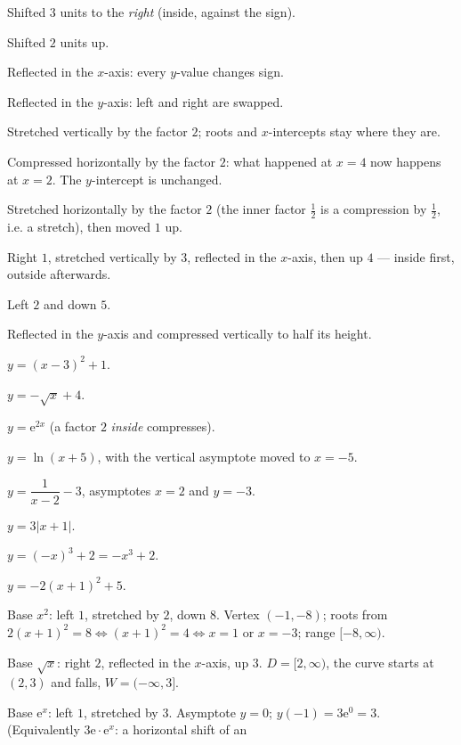 \begin{solutions}
  \item Shifted $3$ units to the \emph{right} (inside, against the sign).
  \item Shifted $2$ units up.
  \item Reflected in the $x$-axis: every $y$-value changes sign.
  \item Reflected in the $y$-axis: left and right are swapped.
  \item Stretched vertically by the factor $2$; roots and $x$-intercepts
        stay where they are.
  \item Compressed horizontally by the factor $2$: what happened at $x=4$
        now happens at $x=2$. The $y$-intercept is unchanged.
  \item Stretched horizontally by the factor $2$ (the inner factor
        $\tfrac12$ is a compression by $\tfrac12$, i.e. a stretch), then
        moved $1$ up.
  \item Right $1$, stretched vertically by $3$, reflected in the $x$-axis,
        then up $4$ --- inside first, outside afterwards.
  \item Left $2$ and down $5$.
  \item Reflected in the $y$-axis and compressed vertically to half its
        height.
  \item $y=(x-3)^{2}+1$.
  \item $y=-\sqrt{x}+4$.
  \item $y=\mathrm{e}^{2x}$ (a factor $2$ \emph{inside} compresses).
  \item $y=\ln(x+5)$, with the vertical asymptote moved to $x=-5$.
  \item $y=\dfrac{1}{x-2}-3$, asymptotes $x=2$ and $y=-3$.
  \item $y=3|x+1|$.
  \item $y=(-x)^{3}+2=-x^{3}+2$.
  \item $y=-2(x+1)^{2}+5$.
  \item Base $x^{2}$: left $1$, stretched by $2$, down $8$. Vertex
        $(-1,-8)$; roots from $2(x+1)^{2}=8\iff(x+1)^{2}=4\iff x=1$ or
        $x=-3$; range $[-8,\infty)$.
  \item Base $\sqrt{x}$: right $2$, reflected in the $x$-axis, up $3$.
        $D=[2,\infty)$, the curve starts at $(2,3)$ and falls,
        $W=(-\infty,3]$.
  \item Base $\mathrm{e}^{x}$: left $1$, stretched by $3$. Asymptote
        $y=0$; $y(-1)=3\mathrm{e}^{0}=3$. (Equivalently
        $3\mathrm{e}\cdot\mathrm{e}^{x}$: a horizontal shift of an

\end{solutions}
